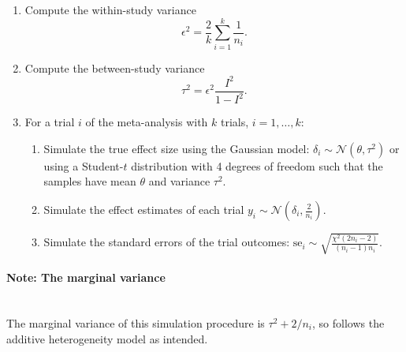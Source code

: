 \documentclass[letterpaper, 12pt]{article}
\newcommand{\N}{\mathcal{N}}
\begin{document}
\begin{enumerate}
\item Compute the within-study variance
  \begin{equation} \label{eq:eps2}
    \epsilon^2 = \frac{2}{k} \sum\limits_{i=1}^k \frac{1}{n_i}.
  \end{equation}
\item Compute the between-study variance
  \begin{equation}\label{eq:eq1}
    \tau^2 = \epsilon^2 \frac{I^2}{1-I^2}.
  \end{equation}
\item For a trial $i$ of the meta-analysis with $k$ trials, $i = 1, \dots, k$:
  \begin{enumerate}
    \item Simulate the true effect size using the Gaussian model:
      $\delta_i \sim \N(\theta, \tau^2)$ or using a Student-$t$ distribution
      with 4 degrees of freedom such that the samples have mean $\theta$ and
      variance $\tau^2$.
    \item Simulate the effect estimates of each trial
      $y_i \sim \N(\delta_i, \frac{2}{n_i})$.
    \item Simulate the standard errors of the trial outcomes:
      $\text{se}_i \sim \sqrt{\frac{\chi^2(2n_i-2)}{(n_i-1)n_i}}$.
  \end{enumerate}
\end{enumerate}

\paragraph{Note: The marginal variance}\mbox{}\\
The marginal variance of this simulation procedure is
$\tau^2 + 2/n_i$, so follows the additive heterogeneity model as intended.
\end{document}
